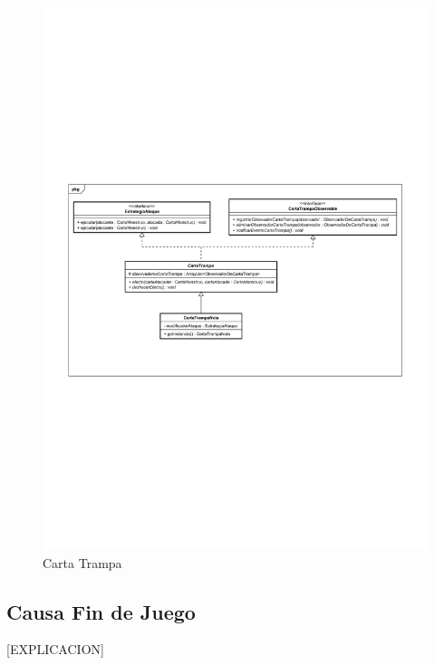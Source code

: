 \begin{figure}[H]
	\centering
	\includegraphics[scale=0.8]{includes/class_CartaTrampa}
	\caption{Carta Trampa}
	\label{class_Carta_Trampa}
\end{figure}

\subsection{Causa Fin de Juego}

[EXPLICACION]

